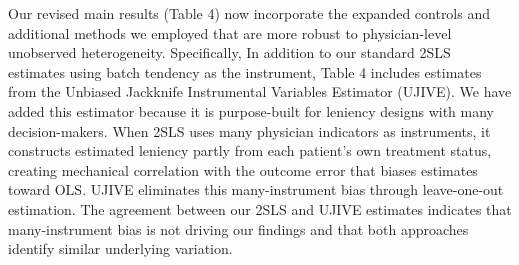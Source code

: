 \documentclass[11pt]{article}
\newcommand{\1}{\hbox{\rm 1\kern-.35em 1}}
\begin{document}
Our revised main results (Table 4) now incorporate the expanded controls and additional methods we employed that are more robust to physician-level unobserved heterogeneity. Specifically, In addition to our standard 2SLS estimates using batch tendency as the instrument, Table 4 includes estimates from the Unbiased Jackknife Instrumental Variables Estimator (UJIVE). We have added this estimator because it is purpose-built for leniency designs with many decision-makers. When 2SLS uses many physician indicators as instruments, it constructs estimated leniency partly from each patient's own treatment status, creating mechanical correlation with the outcome error that biases estimates toward OLS. UJIVE eliminates this many-instrument bias through leave-one-out estimation. The agreement between our 2SLS and UJIVE estimates indicates that many-instrument bias is not driving our findings and that both approaches identify similar underlying variation.
\end{document}
